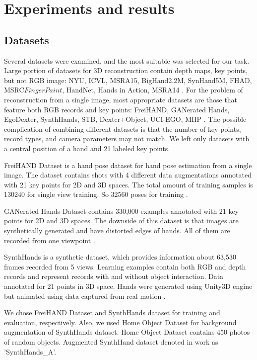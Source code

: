 \chapter{Experiments and results}

\section{Datasets}

Several datasets were examined, and the most suitable was selected for our task. Large portion of datasets for 3D reconstruction contain depth maps, key points, but not RGB image: NYU, ICVL, MSRA15, BigHand2.2M, SynHand5M, FHAD, MSRC\(FingerPaint\), HandNet, Hands in Action, MSRA14 \cite{1,2,3,4,15,16,17,18,19,20}. For the problem of reconstruction from a single image, most appropriate datasets are those that feature both RGB records and key points: FreiHAND, GANerated Hands, EgoDexter, SynthHands, STB, Dexter+Object, UCI-EGO, MHP \cite{4, 11, 12, 14, 21, 22}. The possible complication of combining different datasets is that the number of key points, record types, and camera parameters may not match. We left only datasets with a central position of a hand and 21 labeled key points.

FreiHAND Dataset is a hand pose dataset for hand pose estimation from a single image. The dataset contains shots with 4 different data augmentations annotated with 21 key points for 2D and 3D spaces. The total amount of training samples is 130240 for single view training. So 32560 poses for training \cite{4}. 

GANerated Hands Dataset contains 330,000 examples annotated with 21 key points for 2D and 3D spaces. The downside of this dataset is that images are synthetically generated and have distorted edges of hands. All of them are recorded from one viewpoint \cite{11}.

SynthHands is a synthetic dataset, which provides information about 63,530 frames recorded from 5 views. Learning examples contain both RGB and depth records and represent records with and without object interaction. Data annotated for 21 points in 3D space. Hands were generated using Unity3D engine but animated using data captured from real motion \cite{12}. 

We chose FreiHAND Dataset and SynthHands dataset for training and evaluation, respectively. Also, we used Home Object Dataset for background augmentation of SynthHands dataset. Home Object Dataset \cite{HOD} contains 450 photos of random objects. Augmented SynthHand dataset denoted in work as 'SynthHands\_A'.


